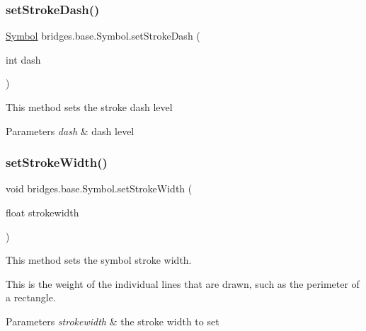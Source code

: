 \subsubsection{\texorpdfstring{set\+Stroke\+Dash()}{setStrokeDash()}}
{\footnotesize\ttfamily \hyperlink{classbridges_1_1base_1_1_symbol}{Symbol} bridges.\+base.\+Symbol.\+set\+Stroke\+Dash (\begin{DoxyParamCaption}\item[{int}]{dash }\end{DoxyParamCaption})}

This method sets the stroke dash level


\begin{DoxyParams}{Parameters}
{\em dash} & dash level \\
\hline
\end{DoxyParams}
\mbox{\label{classbridges_1_1base_1_1_symbol_a68f46f0e555e916c59a69d2b3e9e495d}} 
\subsubsection{\texorpdfstring{set\+Stroke\+Width()}{setStrokeWidth()}}
{\footnotesize\ttfamily void bridges.\+base.\+Symbol.\+set\+Stroke\+Width (\begin{DoxyParamCaption}\item[{float}]{strokewidth }\end{DoxyParamCaption})}



This method sets the symbol stroke width. 

This is the weight of the individual lines that are drawn, such as the perimeter of a rectangle.


\begin{DoxyParams}{Parameters}
{\em strokewidth} & the stroke width to set \\
\hline
\end{DoxyParams}
\mbox{\label{classbridges_1_1base_1_1_symbol_affb384e1e7e22d7bcb6ca0bf0d4ebbc3}} 
